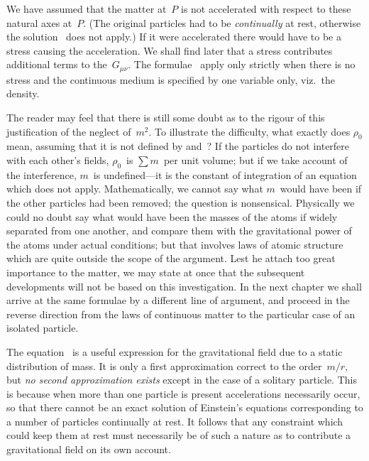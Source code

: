 \documentclass[12pt]{book}
\begin{document}
We have assumed that the matter at~$P$ is not accelerated with respect to
these natural axes at~$P$. (The original particles had to be \emph{continually} at rest,
otherwise the solution~ does not apply.) If it were accelerated there
would have to be a stress causing the acceleration. We shall find later that
a stress contributes additional terms to the~$G_{\mu\nu}$. The formulae~ apply
only strictly when there is no stress and the continuous medium is specified
by one variable only, viz.\ the density.

The reader may feel that there is still some doubt as to the rigour of this
justification of the neglect of~$m^{2}$\footnotemark.\footnotetext
  {To illustrate the difficulty, what exactly does $\rho_{0}$ mean, assuming that it is not defined by
   and~? If the particles do not interfere with each other's fields, $\rho_{0}$~is $\sum m$~per unit
  volume; but if we take account of the interference, $m$~is undefined---it is the constant of integration
  of an equation which does not apply. Mathematically, we cannot say what $m$~would have
  been if the other particles had been removed; the question is nonsensical. Physically we could
  no doubt say what would have been the masses of the atoms if widely separated from one another,
  and compare them with the gravitational power of the atoms under actual conditions; but that
  involves laws of atomic structure which are quite outside the scope of the argument.}
Lest he attach too great importance to the
matter, we may state at once that the subsequent developments will not be
based on this investigation. In the next chapter we shall arrive at the same
formulae by a different line of argument, and proceed in the reverse direction
from the laws of continuous matter to the particular case of an isolated
particle.

The equation~ is a useful expression for the gravitational field due
%
to a static distribution of mass. It is only a first approximation correct to the
order~$m/r$, but \emph{no second approximation exists} except in the case of a solitary
particle. This is because when more than one particle is present accelerations
necessarily occur, so that there cannot be an exact solution of Einstein's
equations corresponding to a number of particles continually at rest. It follows
that any constraint which could keep them at rest must necessarily be of such
a nature as to contribute a gravitational field on its own account.
\end{document}

